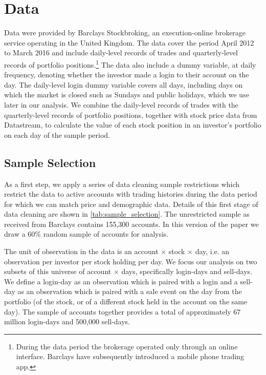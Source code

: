 \section{Data}

Data were provided by Barclays Stockbroking, an execution-online brokerage service operating in the United Kingdom. The data cover the period April 2012 to March 2016 and include daily-level records of trades and quarterly-level records of portfolio positions.\footnote{During the data period the brokerage operated only through an online interface. Barclays have subsequently introduced a mobile phone trading app.} The data also include a dummy variable, at daily frequency, denoting whether the investor made a login to their account on the day. The daily-level login dummy variable covers all days, including days on which the market is closed such as Sundays and public holidays, which we use later in our analysis. We combine the daily-level records of trades with the quarterly-level records of portfolio positions, together with stock price data from Datastream, to calculate the value of each stock position in an investor's portfolio on each day of the sample period.

\subsection{Sample Selection}

As a first step, we apply a series of data cleaning sample restrictions which restrict the data to active accounts with trading histories during the data period for which we can match price and demographic data. Details of this first stage of data cleaning are shown in \ref{tab:sample_selection}. The unrestricted sample as received from Barclays contains 155,300 accounts. In this version of the paper we draw a 60\% random sample of accounts for analysis. 

The unit of observation in the data is an account $\times$ stock $\times$ day, i.e. an observation per investor per stock holding per day. We focus our analysis on two subsets of this universe of account $\times$ days, specifically login-days and sell-days. We define a login-day as an observation which is paired with a login and a sell-day as an observation which is paired with a sale event on the day from the portfolio (of the stock, or of a different stock held in the account on the same day). The sample of accounts together provides a total of approximately 67 million login-days and 500,000 sell-days.

